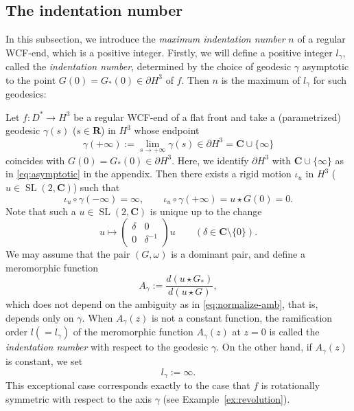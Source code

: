 \documentclass[a4paper]{amsart}
\theoremstyle{plain}
\theoremstyle{remark}
\numberwithin{equation}{section}
\begin{document}
\subsection*{The indentation number}
In this subsection, we introduce the {\em maximum indentation number\/}
$n$ of a regular WCF-end, which is a positive integer.
Firstly, we will define a positive integer $l_\gamma$,
called the {\em indentation number},
determined by the choice of geodesic $\gamma$ asymptotic to 
the point $G(0)=G_*(0)\in \partial H^3$ of $f$.
Then $n$ is the maximum of $l_\gamma$ for such geodesics:

Let $f\colon{}D^*\to H^3$ be a regular WCF-end of a flat front
and take a (parametrized) geodesic $\gamma(s)$ 
($s\in {\boldsymbol{R}}$) in $H^3$ whose endpoint
\[
  \gamma(+\infty):=\lim_{s\to +\infty}\gamma(s)\in  \partial H^3
          ={\boldsymbol{C}}\cup\{\infty\}
\]
coincides with $G(0)=G_*(0)\in\partial H^3$.
Here, we identify $\partial H^3$ with ${\boldsymbol{C}}\cup\{\infty\}$ as in
\eqref{eq:asymptotic} in the appendix.
Then there exists a rigid motion $\iota_u$ in $H^3$ ($u\in {\operatorname{SL}}(2,{\boldsymbol{C}})$)
such that 
\begin{equation}\label{eq:normal-axis}
   \iota_u\circ\gamma(-\infty)=\infty,\qquad
   \iota_u\circ\gamma(+\infty)=u\star G(0)=0.
\end{equation}
Note that such a $u\in{\operatorname{SL}}(2,{\boldsymbol{C}})$ is unique up to the change
\begin{equation}\label{eq:normalize-amb}
   u \longmapsto \begin{pmatrix}
		  \delta & 0 \\
		    0 & \delta^{-1}
		  \end{pmatrix} u
		  \qquad (\delta\in{\boldsymbol{C}}\setminus\{0\}).
\end{equation}
We may assume that the pair $(G,\omega)$ is a dominant pair,
and define a meromorphic function 
\begin{equation}\label{eq:ratio}
   A_\gamma:=\frac{d(u\star G_*)}{d(u\star G)},
\end{equation}
which does not depend on the ambiguity as in \eqref{eq:normalize-amb},
that is, depends only on $\gamma$.
When $A_\gamma(z)$ is not a constant function,
the ramification order $l(=l_\gamma)$ of the
meromorphic function $A_\gamma(z)$ at $z=0$
is called the {\it indentation number} with respect to
the geodesic $\gamma$. 
On the other hand, if $A_\gamma(z)$ is constant, we set 
\begin{equation}\label{eq:l-gamma-rot}
  l_\gamma:=\infty.
\end{equation}
This exceptional case corresponds exactly to
the case that $f$ is rotationally symmetric with respect to the
axis $\gamma$ (see Example~\ref{ex:revolution}).
\end{document}
